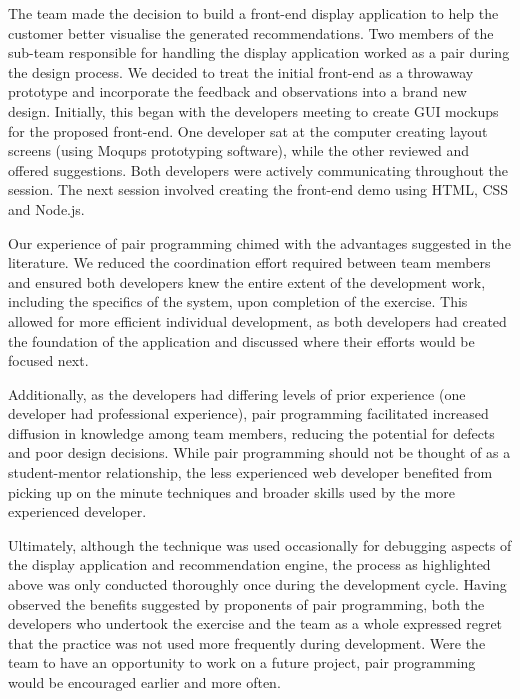 \documentclass{l3proj}
\begin{document}
The team made the decision to build a front-end display application to help the customer better visualise the generated recommendations. Two members of the sub-team responsible for handling the display application worked as a pair during the design process. We decided to treat the initial front-end as a throwaway prototype and incorporate the feedback and observations into a brand new design. Initially, this began with the developers meeting to create GUI mockups for the proposed front-end. One developer sat at the computer creating layout screens (using Moqups prototyping software), while the other reviewed and offered suggestions. Both developers were actively communicating throughout the session. The next session involved creating the front-end demo using HTML, CSS and Node.js.

Our experience of pair programming chimed with the advantages suggested in the literature. We reduced the coordination effort required between team members and ensured both developers knew the entire extent of the development work, including the specifics of the system, upon completion of the exercise. This allowed for more efficient individual development, as both developers had created the foundation of the application and discussed where their efforts would be focused next.

Additionally, as the developers had differing levels of prior experience (one developer had professional experience), pair programming facilitated increased diffusion in knowledge among team members, reducing the potential for defects and poor design decisions. While pair programming should not be thought of as a student-mentor relationship, the less experienced web developer benefited from picking up on the minute techniques and broader skills used by the more experienced developer.

Ultimately, although the technique was used occasionally for debugging aspects of the display application and recommendation engine, the process as highlighted above was only conducted thoroughly once during the development cycle. Having observed the benefits suggested by proponents of pair programming, both the developers who undertook the exercise and the team as a whole expressed regret that the practice was not used more frequently during development. Were the team to have an opportunity to work on a future project, pair programming would be encouraged earlier and more often.
\end{document}
